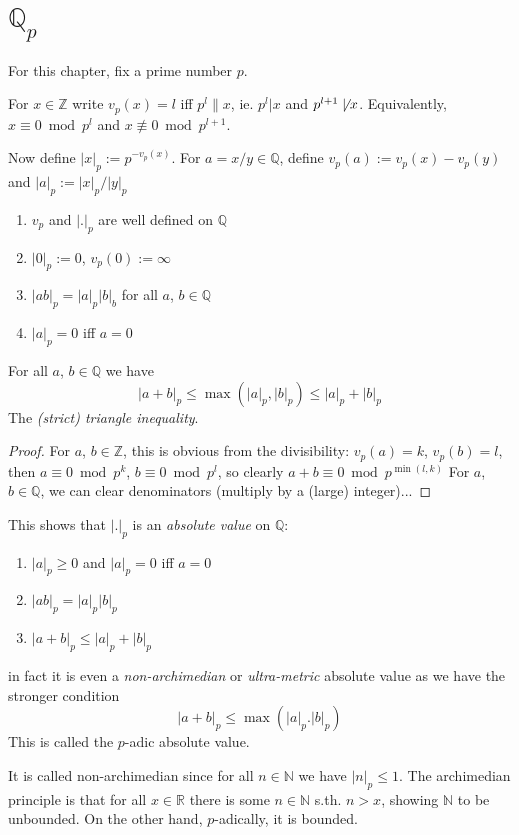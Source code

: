 \chapter{$\mathbb Q_p$}
For this chapter, fix a prime number $p$.
\begin{definition}
  For $x\in\mathbb Z$ write $v_p(x) = l$ iff $p^l\| x$, ie.
  $p^l|x$ and $p^{l+1}\not\mid x$.
  Equivalently, $x\equiv 0\bmod p^l$ and $x\not\equiv 0\bmod p^{l+1}$.

  Now define $|x|_p := p^{-v_p(x)}$. For $a = x/y\in \mathbb Q$, define
  $v_p(a) := v_p(x) - v_p(y)$ and $|a|_p := |x|_p/|y|_p$
\end{definition}
\begin{remark}
  \begin{enumerate}
    \item $v_p$ and $|.|_p$ are well defined on $\mathbb Q$
    \item $|0|_p := 0$, $v_p(0) := \infty$
    \item $|ab|_p = |a|_p |b|_b$ for all $a$, $b\in \mathbb Q$
    \item $|a|_p = 0$ iff $a=0$
  \end{enumerate}
\end{remark}
\begin{lemma}
  For all $a$, $b\in \mathbb Q$ we have
  $$|a+b|_p \le \max(|a|_p, |b|_p) \le |a|_p + |b|_p$$
  The {\em (strict) triangle inequality}.
\end{lemma}
\begin{proof}
  For $a$, $b\in \mathbb Z$, this is obvious from the divisibility:
  $v_p(a) = k$, $v_p(b) = l$, then $a\equiv 0 \bmod p^k$, $b\equiv 0 \bmod p^l$, so clearly $a+b \equiv 0 \bmod p^{\min(l, k)}$
  For $a$, $b\in \mathbb Q$, we can clear denominators (multiply by a
  (large) integer)...
\end{proof}
\begin{remark}
  This shows that $|.|_p$ is an {\em absolute value} on $\mathbb Q$:
  \begin{enumerate}
    \item $|a|_p \ge 0$ and $|a|_p = 0$ iff $a=0$
    \item $|ab|_p = |a|_p |b|_p$
    \item $|a+b|_p \le |a|_p + |b|_p$
  \end{enumerate}
  in fact it is even a {\em non-archimedian} or {\em ultra-metric}
  absolute value as we have the stronger condition
  $$|a+b|_p \le \max(|a|_p. |b|_p)$$
  This is called the $p$-adic absolute value.
\end{remark}
It is called non-archimedian since for all $n\in \mathbb N$ we have
$|n|_p \le 1$. The archimedian principle is that for all $x\in\mathbb R$ there
is some $n\in \mathbb N$ s.th. $n>x$, showing $\mathbb N$ to be unbounded.
On the other hand, $p$-adically, it is bounded.

